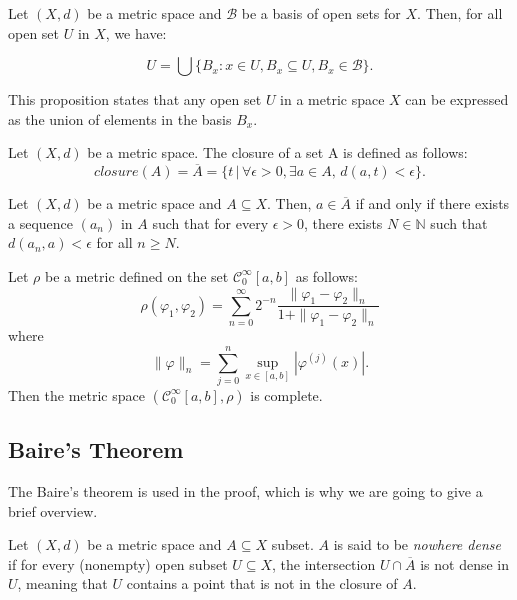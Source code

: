 \documentclass[../main.tex]{subfiles}
\begin{document}
\begin{propo}
Let $(X, d)$ be a metric space and $\mathcal{B}$ be a basis of open sets for $X$. Then, for all open set $U$ in $X$, we have:

$$U = \bigcup \{B_x : x \in U, B_x \subseteq U, B_x \in \mathcal{B}\}.$$

\noindent This proposition states that any open set $U$ in a metric space $X$ can be expressed as the union of elements in the basis $B_x$.
\end{propo}


\begin{definition}Let $(X, d)$ be a metric space. The closure of a set A is defined as follows:
	$$closure(A) = \overline{A}=\{t \, |  \, \forall \epsilon> 0, \exists a \in A, \, d(a, t) < \epsilon\}.$$
\end{definition}

\begin{propo} \label{prop:23} Let $(X, d)$ be a metric space and $A \subseteq X$. Then, $a \in \overline{A}$ if and only if there exists a sequence $(a_n)$ in $A$ such that for every $\epsilon > 0$, there exists $N \in \mathbb{N}$ such that $d(a_n, a) < \epsilon$ for all $n \geq N.$
\end{propo}

\begin{propo} \cite[Prop. 7]{frech} \label{prop:frech}
	Let $\rho$ be a metric defined on the set $\mathcal{C}^\infty_0[a,b]$ as follows:
	$$\rho(\varphi_1,\varphi_2) = \sum_{n=0}^\infty 2^{-n}  \frac{\|\varphi_1 -\varphi_2\|_n}{1+\|\varphi_1 -\varphi_2\|_n}$$ where $$\|\varphi\|_n= \sum_{j=0}^n \sup_{x\in [a,b]} | \varphi^{(j)}(x)|. $$  Then the metric space $(\mathcal{C}^\infty_0[a,b],\rho)$  is complete.
\end{propo}




\subsection{Baire's Theorem}
\noindent The Baire's theorem is used in the proof, which is why we are going to give a brief overview.

\begin{definition} Let $(X,d)$ be a metric space and $A\subseteq X$ subset. $A$ is said to be \emph{nowhere dense} if for every (nonempty) open subset $U\subseteq X$, the intersection $U\cap\overline{A}$ is not dense in $U$, meaning that $U$ contains a point that is not in the closure of $A$.
\end{definition}
\end{document}
